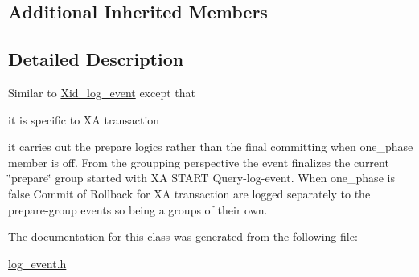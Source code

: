 \subsection*{Additional Inherited Members}


\subsection{Detailed Description}
Similar to \mbox{\hyperlink{classXid__log__event}{Xid\+\_\+log\+\_\+event}} except that
\begin{DoxyItemize}
\item it is specific to XA transaction
\item it carries out the prepare logics rather than the final committing when {\ttfamily one\+\_\+phase} member is off. From the groupping perspective the event finalizes the current \char`\"{}prepare\char`\"{} group started with XA S\+T\+A\+RT Query-\/log-\/event. When {\ttfamily one\+\_\+phase} is false Commit of Rollback for XA transaction are logged separately to the prepare-\/group events so being a groups of their own. 
\end{DoxyItemize}

The documentation for this class was generated from the following file\+:\begin{DoxyCompactItemize}
\item 
\mbox{\hyperlink{log__event_8h}{log\+\_\+event.\+h}}\end{DoxyCompactItemize}
